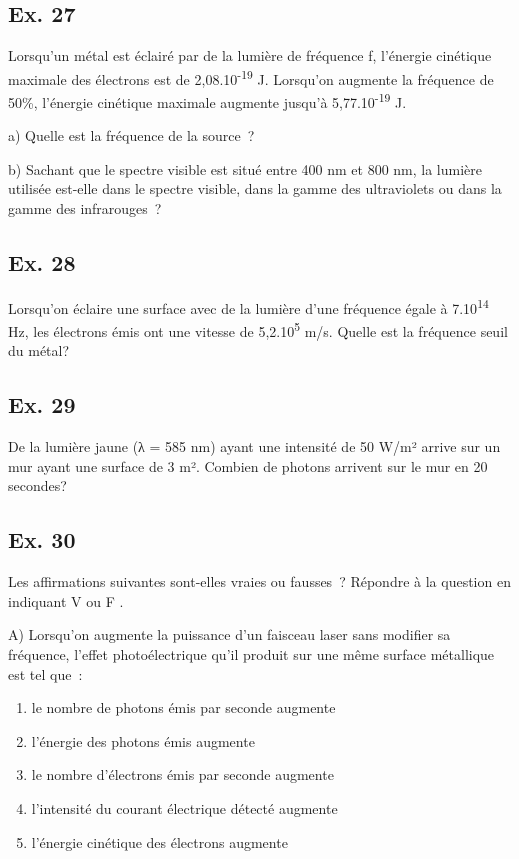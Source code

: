 {\subsection{Ex. 27}

Lorsqu'un métal est éclairé par de la lumière de fréquence f, l'énergie
cinétique maximale des électrons est de 2,08.10\textsuperscript{-19} J.
Lorsqu'on augmente la fréquence de 50\%, l'énergie cinétique maximale
augmente jusqu'à 5,77.10\textsuperscript{-19} J.

a) Quelle est la fréquence de la source~?

b) Sachant que le spectre visible est situé entre 400 nm et 800 nm, la
lumière utilisée est-elle dans le spectre visible, dans la gamme des
ultraviolets ou dans la gamme des infrarouges~?

\subsection{Ex. 28}

Lorsqu'on éclaire une surface avec de la lumière d'une fréquence égale à
7.10\textsuperscript{14 }Hz, les électrons émis ont une vitesse de
5,2.10\textsuperscript{5} m/s. Quelle est la fréquence seuil du métal?

\subsection{Ex. 29}

De la lumière jaune (λ = 585 nm) ayant une intensité de 50 W/m² arrive
sur un mur ayant une surface de 3 m². Combien de photons arrivent sur le
mur en 20 secondes?

\subsection{Ex. 30}

Les affirmations suivantes sont-elles vraies ou fausses~? Répondre à la
question en indiquant V ou F .

A) Lorsqu'on augmente la puissance d'un faisceau laser sans modifier sa
fréquence, l'effet photoélectrique qu'il produit sur une même surface
métallique est tel que~:
\begin{enumerate}
\item  le nombre de photons émis par seconde augmente
\item  l'énergie des photons émis augmente
\item  le nombre d'électrons émis par seconde augmente
\item  l'intensité du courant électrique détecté augmente
\item  l'énergie cinétique des électrons augmente
\end{enumerate}

}
